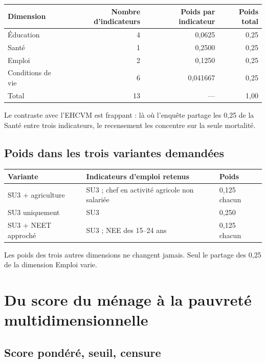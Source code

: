 \documentclass[11pt,a4paper]{article}
\begin{document}
\begin{center}
\small
\begin{tabular}{@{}lrrr@{}}
\toprule
\textbf{Dimension} & \textbf{Nombre d'indicateurs} & \textbf{Poids par indicateur} &
\textbf{Poids total} \\
\midrule
Éducation & 4 & 0,0625 & 0,25 \\
Santé & 1 & 0,2500 & 0,25 \\
Emploi & 2 & 0,1250 & 0,25 \\
Conditions de vie & 6 & 0,041667 & 0,25 \\
\midrule
Total & 13 & --- & 1,00 \\
\bottomrule
\end{tabular}
\end{center}

Le contraste avec l'EHCVM est frappant : là où l'enquête partage les 0,25 de la Santé entre
trois indicateurs, le recensement les concentre sur la seule mortalité.

\subsection{Poids dans les trois variantes demandées}

\begin{center}
\small
\begin{tabular}{@{}p{4.3cm}p{7cm}p{2.1cm}@{}}
\toprule
\textbf{Variante} & \textbf{Indicateurs d'emploi retenus} & \textbf{Poids} \\
\midrule
SU3 + agriculture & SU3 ; chef en activité agricole non salariée & 0,125 chacun \\
SU3 uniquement & SU3 & 0,250 \\
SU3 + NEET approché & SU3 ; NEE des 15--24 ans & 0,125 chacun \\
\bottomrule
\end{tabular}
\end{center}

Les poids des trois autres dimensions ne changent jamais. Seul le partage des 0,25 de la
dimension Emploi varie.

\section{Du score du ménage à la pauvreté multidimensionnelle}

\subsection{Score pondéré, seuil, censure}
\end{document}
